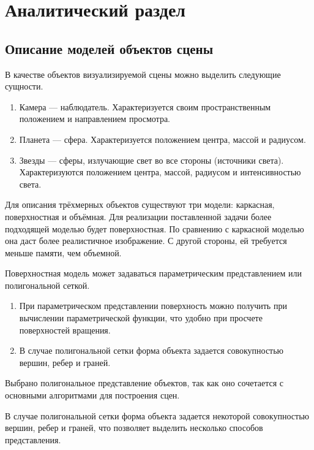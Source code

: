 \chapter{Аналитический раздел}

\section{Описание моделей объектов сцены}

В качестве объектов визуализируемой сцены можно выделить следующие сущности.

\begin{enumerate}
	\item Камера --- наблюдатель. Характеризуется своим пространственным положением и направлением просмотра.
	\item Планета --- сфера. Характеризуется положением центра, массой и радиусом.
	\item Звезды --- сферы, излучающие свет во все стороны (источники света). Характеризуются положением центра, массой, радиусом и интенсивностью света.
\end{enumerate}

Для описания трёхмерных объектов существуют три модели: каркасная, поверхностная и объёмная. Для реализации поставленной задачи более подходящей моделью будет поверхностная. По сравнению с каркасной моделью она даст более реалистичное изображение. С другой стороны, ей требуется меньше памяти, чем объемной. 

Поверхностная модель может задаваться параметрическим представлением или полигональной сеткой.

\begin{enumerate}
	\item При параметрическом представлении поверхность можно получить при вычислении параметрической функции, что удобно при просчете поверхностей вращения.
	\item В случае полигональной сетки форма объекта задается совокупностью вершин, ребер и граней.
\end{enumerate}

Выбрано полигональное представление объектов, так как оно сочетается с основными алгоритмами для построения сцен.

В случае полигональной сетки форма объекта задается некоторой совокупностью вершин, ребер и граней, что позволяет выделить несколько способов представления.

